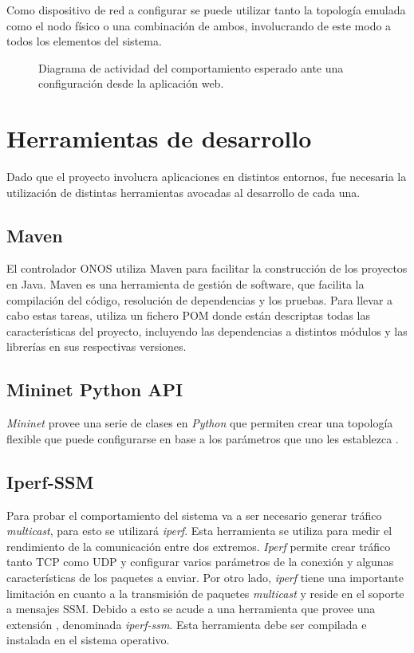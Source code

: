 Como dispositivo de red a configurar se puede utilizar tanto la topología emulada como el nodo físico o una combinación de ambos, involucrando de este modo 
a todos los elementos del sistema.


\begin{figure}[th]
    \centering 
    \caption[Diagrama de Actividad SysML]{Diagrama de actividad del comportamiento esperado ante una configuración desde la aplicación web.}
    \label{fig:ActivDia}
\end{figure}

\section{Herramientas de desarrollo}

Dado que el proyecto involucra aplicaciones en distintos entornos, fue necesaria la utilización de distintas herramientas avocadas 
al desarrollo de cada una.

\subsection{Maven}
El controlador ONOS utiliza Maven \parencite{maven} para facilitar la construcción de los proyectos en Java. Maven es una herramienta de gestión de software, que facilita la compilación del código, resolución de dependencias y los pruebas. Para llevar a cabo estas tareas, utiliza un fichero POM donde están descriptas todas las características del proyecto, incluyendo las dependencias a distintos módulos y las librerías en sus respectivas versiones.
 
\subsection{Mininet Python API}
\textit{Mininet} provee una serie de clases en \textit{Python} que permiten crear una topología flexible que puede configurarse en base a los parámetros que uno les establezca \parencite{mininet}. 

\subsection{Iperf-SSM}\label{sec:iperf}
Para probar el comportamiento del sistema va a ser necesario generar tráfico \textit{multicast}, para esto se utilizará \textit{iperf}. Esta herramienta se utiliza para medir el rendimiento de la comunicación entre dos extremos. \textit{Iperf} permite crear tráfico tanto TCP como UDP y configurar varios parámetros de la conexión y algunas características de los paquetes a enviar. Por otro lado, \textit{iperf} tiene una importante limitación en cuanto a la transmisión de paquetes \textit{multicast} y reside en el soporte a mensajes SSM. Debido a esto se acude a una herramienta que provee una extensión \parencite{iperfssm}, denominada \textit{iperf-ssm}. Esta herramienta debe ser compilada e instalada en el sistema operativo.
 
